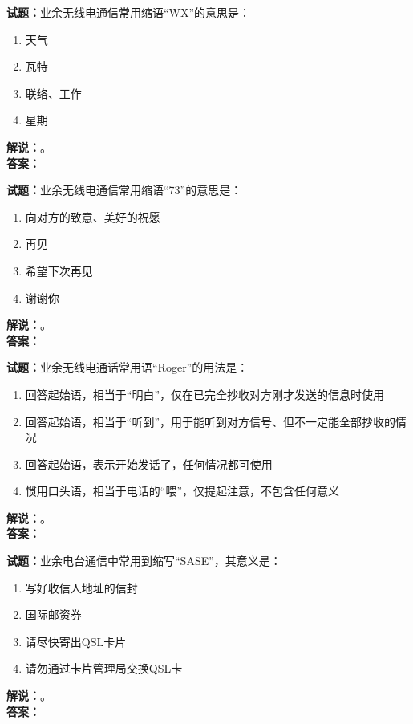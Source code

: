 \documentclass{ctexbook}
\begin{document}
\vspace{\baselineskip}

\noindent\textbf{试题：}业余无线电通信常用缩语“WX”的意思是：
\begin{enumerate}[leftmargin=3em]
  \item 天气
  \item 瓦特
  \item 联络、工作
  \item 星期
\end{enumerate}
\noindent\textbf{解说：}\textbf{}。\\\noindent\textbf{答案：}

\vspace{\baselineskip}

\noindent\textbf{试题：}业余无线电通信常用缩语“73”的意思是：
\begin{enumerate}[leftmargin=3em]
  \item 向对方的致意、美好的祝愿
  \item 再见
  \item 希望下次再见
  \item 谢谢你
\end{enumerate}
\noindent\textbf{解说：}\textbf{}。\\\noindent\textbf{答案：}

\vspace{\baselineskip}

\noindent\textbf{试题：}业余无线电通话常用语“Roger”的用法是：
\begin{enumerate}[leftmargin=3em]
  \item 回答起始语，相当于“明白”，仅在已完全抄收对方刚才发送的信息时使用
  \item 回答起始语，相当于“听到”，用于能听到对方信号、但不一定能全部抄收的情况
  \item 回答起始语，表示开始发话了，任何情况都可使用
  \item 惯用口头语，相当于电话的“喂”，仅提起注意，不包含任何意义
\end{enumerate}
\noindent\textbf{解说：}\textbf{}。\\\noindent\textbf{答案：}

\vspace{\baselineskip}

\noindent\textbf{试题：}业余电台通信中常用到缩写“SASE”，其意义是：
\begin{enumerate}[leftmargin=3em]
  \item 写好收信人地址的信封
  \item 国际邮资券
  \item 请尽快寄出QSL卡片
  \item 请勿通过卡片管理局交换QSL卡
\end{enumerate}
\noindent\textbf{解说：}\textbf{}。\\\noindent\textbf{答案：}
\end{document}
